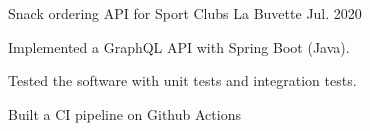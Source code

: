 

\begin{cventries}

  \cventry
    {Snack ordering API for Sport Clubs} %
    {La Buvette} %
    {} %
    {Jul. 2020} %
    {
      \begin{cvitems} %
        \item {Implemented a GraphQL API with Spring Boot (Java).}
        \item {Tested the software with unit tests and integration tests.}
        \item {Built a CI pipeline on Github Actions}
      \end{cvitems}
    }

\end{cventries}
